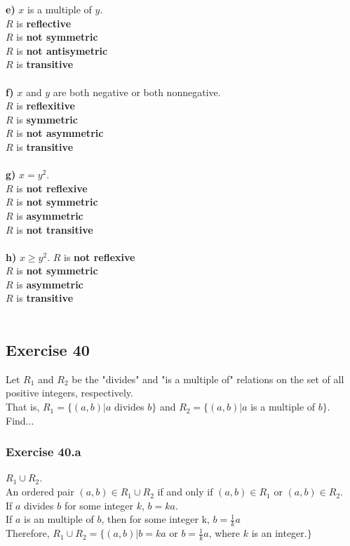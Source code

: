 \documentclass[12pt]{article}
\begin{document}
    \textbf{e)} $ x $ is a multiple of $y$.\\
        $R$ is \textbf{reflective} \\
        $R$ is \textbf{not symmetric} \\
        $R$ is \textbf{not antisymetric} \\
        $R$ is \textbf{transitive} \\
        \\
    \textbf{f)} $ x $ and $y$ are both negative or both nonnegative.\\
        $R$ is \textbf{reflexitive} \\
        $R$ is \textbf{symmetric} \\
        $R$ is \textbf{not asymmetric} \\
        $R$ is \textbf{transitive} \\
        \\
    \textbf{g)} $ x=y^2 $.\\
        $R$ is \textbf{not reflexive} \\
        $R$ is \textbf{not symmetric} \\
        $R$ is \textbf{asymmetric} \\
        $R$ is \textbf{not transitive} \\
        \\
    \textbf{h)} $ x \geq y^2 $.
        $R$ is \textbf{not reflexive} \\
        $R$ is \textbf{not symmetric} \\
        $R$ is \textbf{asymmetric} \\
        $R$ is \textbf{transitive} \\
        \\

    \subsection{Exercise 40}
    Let $R_1$ and $R_2$ be the "divides" and "is a multiple of" relations on the set of all positive integers, respectively.\\
    That is, $R_1 = \{(a,b)|a $ divides $ b\}$ and $R_2=\{(a,b)|a$ is a multiple of $b\}$. Find...
    
    \subsubsection{Exercise 40.a}
    $R_1 \cup R_2$.\\
    An ordered pair $(a,b)\in R_1\cup R_2 $ if and only if $(a,b)\in R_1$ or $(a,b)\in R_2$.\\
    If $a$ divides $b$ for some integer $k$, $b=ka$.\\
    If $a$ is an multiple of $b$, then for some integer k,
    $b=\frac{1}{k}a $\\
    Therefore, $R_1 \cup R_2=\{(a,b)|b=ka$ or $ b=\frac{1}{k}a$, where $k$ is an integer.$\}$
    
\end{document}
